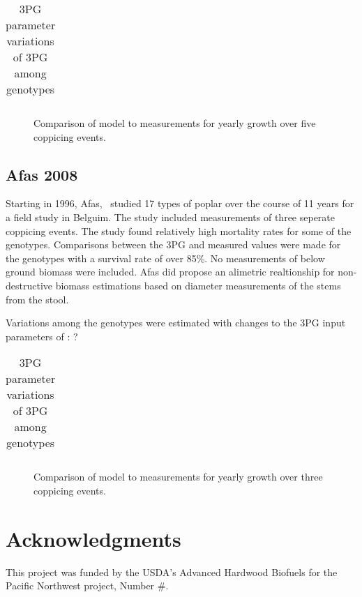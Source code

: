 \documentclass[10pt]{article}
\begin{document}
\begin{table}[!ht]
  \centering
  \begin{tabular}{}
    
  \end{tabular}
  \caption{3PG parameter variations of 3PG among genotypes}
  \label{tab:pont-3pg}
\end{table}

\begin{figure}[!ht]
  \centering

  \caption{Comparison of model to measurements for yearly growth over five
    coppicing events.}
\label{fig:pont-biomass}
\end{figure}


\subsection{Afas 2008}
\label{Afas2008}

Starting in 1996, Afas,~\cite{Afas2008a} studied 17 types of poplar
over the course of 11 years for a field study in Belguim.  The study
included measurements of three seperate coppicing events.  The study
found relatively high mortality rates for some of the genotypes.
Comparisons between the 3PG and measured values were made for the
genotypes with a survival rate of over 85\%.  No measurements of below
ground biomass were included.  Afas did propose an alimetric
realtionship for non-destructive biomass estimations based on diameter
measurements of the stems from the stool.

Variations among the genotypes were estimated with changes to the 3PG
input parameters of : ?

\begin{table}[!ht]
  \centering
  \begin{tabular}{}
    
  \end{tabular}
  \caption{3PG parameter variations of 3PG among genotypes}
  \label{tab:afas-3pg}
\end{table}

\begin{figure}[!ht]
  \centering

  \caption{Comparison of model to measurements for yearly growth over three
    coppicing events.}
\label{fig:afas-biomass}
\end{figure}


\section*{Acknowledgments}
This project was funded by the USDA's Advanced Hardwood Biofuels for
the Pacific Northwest project, Number \#.
\end{document}
